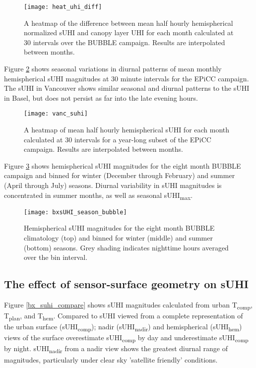 \begin{bibunit}
\begin{figure}[H]
	\centering
	\texttt{[image: heat\_uhi\_diff]}
	\caption{A heatmap of the difference between mean half hourly hemispherical normalized sUHI and canopy layer UHI for each month calculated at 30 \si{\min} intervals over the BUBBLE campaign. Results are interpolated between months.}
	\label{heat_uhi_diff}
\end{figure}

Figure \ref{vanc_suhi} shows seasonal variations in diurnal patterns of mean monthly hemispherical sUHI magnitudes at 30 minute intervals for the EPiCC campaign. The sUHI in Vancouver shows similar seasonal and diurnal patterns to the sUHI in Basel, but does not persist as far into the late evening hours.

\begin{figure}[H]
	\centering
	\texttt{[image: vanc\_suhi]}
	\caption{A heatmap of mean half hourly hemispherical sUHI for each month calculated at 30 \si{\min} intervals for a year-long subset of the EPiCC campaign. Results are interpolated between months.}
	\label{vanc_suhi}
\end{figure}

Figure \ref{bxsUHI_season_bubble} shows hemispherical sUHI magnitudes for the eight month BUBBLE campaign and binned for winter (December through February) and summer (April through July) seasons. Diurnal variability in sUHI magnitudes is concentrated in summer months, as well as seasonal sUHI\textsubscript{max}. 

\begin{figure}[H]
	\centering
	\texttt{[image: bxsUHI\_season\_bubble]}
	\caption{Hemispherical sUHI magnitudes for the eight month BUBBLE climatology (top) and binned for winter (middle) and summer (bottom) seasons. Grey shading indicates nighttime hours averaged over the bin interval.}
	\label{bxsUHI_season_bubble}
\end{figure}

\subsection{The effect of sensor-surface geometry on sUHI}

Figure \ref{bx_suhi_compare} shows sUHI magnitudes calculated from urban T\textsubscript{comp}, T\textsubscript{plan}, and T\textsubscript{hem}. Compared to sUHI viewed from a complete representation of the urban surface (sUHI\textsubscript{comp}); nadir (sUHI\textsubscript{nadir}) and hemispherical (sUHI\textsubscript{hem}) views of the surface overestimate sUHI\textsubscript{comp} by day and underestimate sUHI\textsubscript{comp} by night. sUHI\textsubscript{nadir} from a nadir view shows the greatest diurnal range of magnitudes, particularly under clear sky 'satellite friendly' conditions. 


\end{bibunit}
